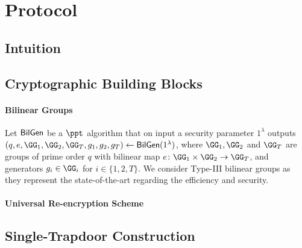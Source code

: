 \section{Protocol}



\subsection{Intuition}

\subsection{Cryptographic Building Blocks}

\paragraph{Bilinear Groups} Let $\mathsf{BilGen}$ be a $\ppt$ algorithm that on input a security 
parameter $1^\lambda$ outputs $(q, e, \GG_1, \GG_2, \GG_T, g_1, g_2, g_T) \gets \BilGen
(1^\lambda)$, where $\GG_1, \GG_2$ and $\GG_T$ are groups of prime order $q$ with bilinear 
map $e \colon \GG_1 \times \GG_2 \to \GG_T$, and generators $g_i \in \GG_i$ for $i \in \{1,2,T\}$.
We consider Type-III bilinear groups as they represent the state-of-the-art regarding the 
efficiency and security.

\paragraph{Universal Re-encryption Scheme} 


\subsection{Single-Trapdoor Construction}

